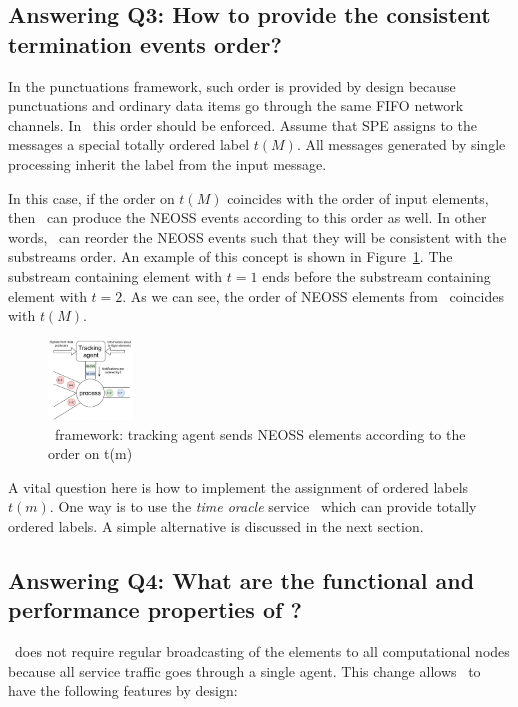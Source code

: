 \subsection{Answering Q3: How to provide the consistent termination events order?}
In the punctuations framework, such order is provided by design because punctuations and ordinary data items go through the same FIFO network channels. In \tracker\, this order should be enforced. Assume that SPE assigns to the messages a special totally ordered label $t(M)$. All messages generated by single processing inherit the label from the input message. 

In this case, if the order on $t(M)$ coincides with the order of input elements, then \tracker\ can produce the NEOSS events according to this order as well. In other words, \tracker\ can reorder the NEOSS events such that they will be consistent with the substreams order. An example of this concept is shown in Figure~\ref{tracker_ordering}. The substream containing element with $t=1$ ends before the substream containing element with $t=2$. As we can see, the order of NEOSS elements from \tracker\ coincides with $t(M)$.

\begin{figure}[t]
  \centering
  \includegraphics[width=0.20\textwidth]{pics/tracker-ordering.pdf}
  \caption{\tracker\ framework: tracking agent sends NEOSS elements according to the order on t(m)}
  \label{tracker_ordering}
\end{figure}

A vital question here is how to implement the assignment of ordered labels $t(m)$. One way is to use the {\em time oracle} service~\cite{10.14778/3055330.3055335} which can provide totally ordered labels. A simple alternative is discussed in the next section. 

\subsection{Answering Q4: What are the functional and performance properties of \tracker?}

\tracker\ does not require regular broadcasting of the elements to all computational nodes because all service traffic goes through a single agent. This change allows \tracker\ to have the following features by design:

